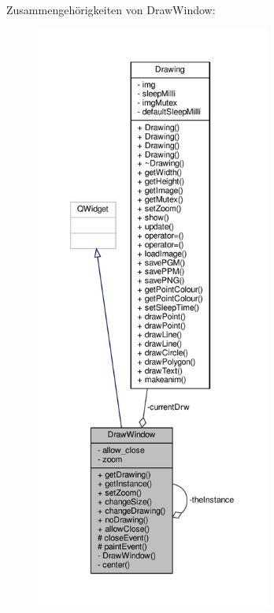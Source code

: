 Zusammengehörigkeiten von Draw\+Window\+:
\nopagebreak
\begin{figure}[H]
\begin{center}
\leavevmode
\includegraphics[height=550pt]{classDrawWindow__coll__graph}
\end{center}
\end{figure}

